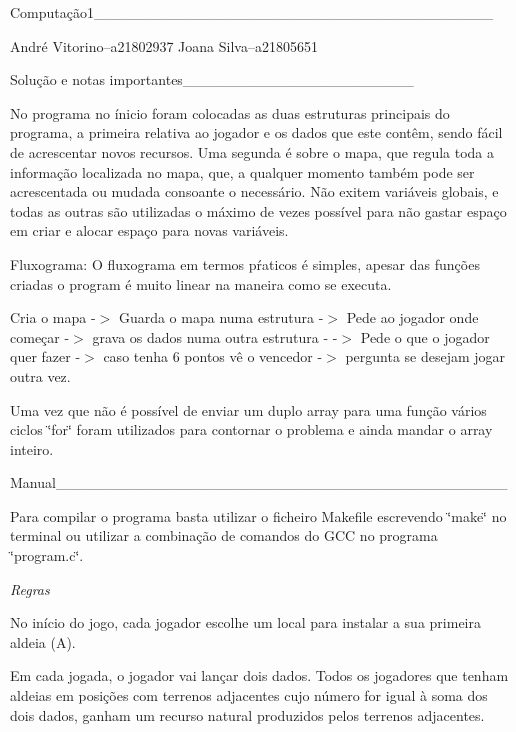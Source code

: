 Computação1\+\_\+\+\_\+\+\_\+\+\_\+\+\_\+\+\_\+\+\_\+\+\_\+\+\_\+\+\_\+\+\_\+\+\_\+\+\_\+\+\_\+\+\_\+\+\_\+\+\_\+\+\_\+\+\_\+\+\_\+\+\_\+\+\_\+\+\_\+\+\_\+\+\_\+\+\_\+\+\_\+\+\_\+\+\_\+\+\_\+\+\_\+\+\_\+\+\_\+\+\_\+\+\_\+\+\_\+\+\_\+\+\_\+

André Vitorino--a21802937 Joana Silva--a21805651

Solução e notas importantes\+\_\+\+\_\+\+\_\+\+\_\+\+\_\+\+\_\+\+\_\+\+\_\+\+\_\+\+\_\+\+\_\+\+\_\+\+\_\+\+\_\+\+\_\+\+\_\+\+\_\+\+\_\+\+\_\+\+\_\+\+\_\+\+\_\+

No programa no ínicio foram colocadas as duas estruturas principais do programa, a primeira relativa ao jogador e os dados que este contêm, sendo fácil de acrescentar novos recursos. Uma segunda é sobre o mapa, que regula toda a informação localizada no mapa, que, a qualquer momento também pode ser acrescentada ou mudada consoante o necessário. Não exitem variáveis globais, e todas as outras são utilizadas o máximo de vezes possível para não gastar espaço em criar e alocar espaço para novas variáveis.

Fluxograma\+: O fluxograma em termos pŕaticos é simples, apesar das funções criadas o program é muito linear na maneira como se executa.

Cria o mapa -\/$>$ Guarda o mapa numa estrutura -\/$>$ Pede ao jogador onde começar -\/$>$ grava os dados numa outra estrutura -\/ -\/$>$ Pede o que o jogador quer fazer -\/$>$ caso tenha 6 pontos vê o vencedor -\/$>$ pergunta se desejam jogar outra vez.

Uma vez que não é possível de enviar um duplo array para uma função vários ciclos \char`\"{}for\char`\"{} foram utilizados para contornar o problema e ainda mandar o array inteiro.

Manual\+\_\+\+\_\+\+\_\+\+\_\+\+\_\+\+\_\+\+\_\+\+\_\+\+\_\+\+\_\+\+\_\+\+\_\+\+\_\+\+\_\+\+\_\+\+\_\+\+\_\+\+\_\+\+\_\+\+\_\+\+\_\+\+\_\+\+\_\+\+\_\+\+\_\+\+\_\+\+\_\+\+\_\+\+\_\+\+\_\+\+\_\+\+\_\+\+\_\+\+\_\+\+\_\+\+\_\+\+\_\+\+\_\+\+\_\+\+\_\+\+\_\+\+\_\+\+\_\+

Para compilar o programa basta utilizar o ficheiro Makefile escrevendo \char`\"{}make\char`\"{} no terminal ou utilizar a combinação de comandos do G\+CC no programa \char`\"{}program.\+c\char`\"{}.

{\itshape Regras}

No início do jogo, cada jogador escolhe um local para instalar a sua primeira aldeia (A).

Em cada jogada, o jogador vai lançar dois dados. Todos os jogadores que tenham aldeias em posições com terrenos adjacentes cujo número for igual à soma dos dois dados, ganham um recurso natural produzidos pelos terrenos adjacentes.

